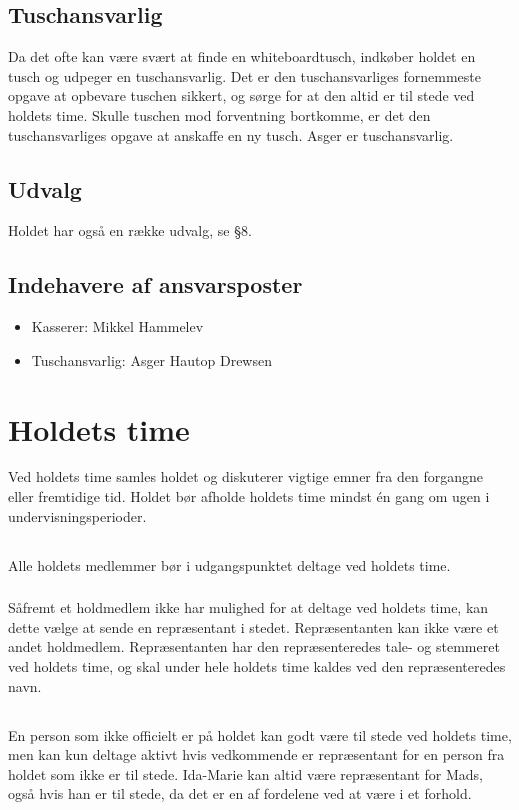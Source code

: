 \documentclass{article}
\let\OldS\S
\renewcommand{\S}{\OldS{}}
\begin{document}
\subsection{Tuschansvarlig}
Da det ofte kan være svært at finde en whiteboardtusch, indkøber holdet en tusch og udpeger en tuschansvarlig. Det er den tuschansvarliges fornemmeste opgave at opbevare tuschen sikkert, og sørge for at den altid er til stede ved holdets time. Skulle 
tuschen mod forventning bortkomme, er det den tuschansvarliges opgave at anskaffe en 
ny tusch. Asger er tuschansvarlig.
\subsection{Udvalg}
Holdet har også en række udvalg, se \S8.
\subsection{Indehavere af ansvarsposter}
\begin{itemize}
    \item Kasserer: Mikkel Hammelev
    \item Tuschansvarlig: Asger Hautop Drewsen
\end{itemize}


\section{Holdets time}
Ved holdets time samles holdet og diskuterer vigtige emner fra den forgangne eller 
fremtidige tid. Holdet bør afholde holdets time mindst én gang om ugen i 
undervisningsperioder.
\subsection{}
Alle holdets medlemmer bør i udgangspunktet deltage ved holdets time.
\subsubsection{}
Såfremt et holdmedlem ikke har mulighed for at deltage ved holdets time, kan dette vælge at sende en repræsentant i stedet. Repræsentanten kan ikke være et andet holdmedlem. Repræsentanten har den repræsenteredes tale- og stemmeret ved holdets time, og skal under hele holdets time kaldes ved den repræsenteredes navn.
\subsection{}
En person som ikke officielt er på holdet kan godt være til stede ved holdets time, men kan kun deltage aktivt hvis vedkommende er repræsentant for en person fra holdet som ikke er til stede. Ida-Marie kan altid være repræsentant for Mads, også hvis han er til stede, da det er en af fordelene ved at være i et forhold.
\end{document}
